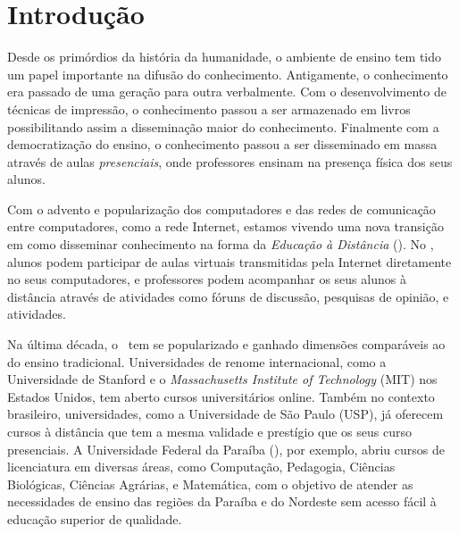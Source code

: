 \chapter{Introdução}


Desde os primórdios da história da humanidade, o ambiente de ensino tem tido um papel
importante na difusão do conhecimento. Antigamente, o conhecimento era passado de uma
geração para outra verbalmente. Com o desenvolvimento de técnicas de impressão, o conhecimento
passou a ser armazenado em livros possibilitando assim a disseminação maior do conhecimento. 
Finalmente com a democratização do ensino, o conhecimento passou a ser disseminado em massa 
através de aulas \emph{presenciais}, onde professores ensinam na presença física dos seus alunos. 

Com o advento e popularização dos computadores e das redes de comunicação entre computadores, como a rede Internet, 
estamos vivendo uma nova transição em como disseminar conhecimento na forma da \emph{Educação à Distância} (\ead). 
No \ead, alunos podem participar de aulas virtuais transmitidas pela Internet diretamente no seus computadores, 
e professores podem acompanhar os seus alunos à distância através de atividades como 
fóruns de discussão, pesquisas de opinião, e atividades.

Na última década, o \ead\ tem se popularizado e ganhado dimensões comparáveis ao do ensino  
tradicional. Universidades de renome internacional, como a Universidade de Stanford e o \emph{Massachusetts Institute of 
Technology} (MIT) nos Estados Unidos, tem aberto cursos universitários online. Também no contexto brasileiro, 
universidades, como a Universidade de São Paulo (USP), já oferecem cursos 
à distância que tem a mesma validade e prestígio que os seus curso presenciais. 
A Universidade Federal da Paraíba (\ufpb), por exemplo, abriu cursos de licenciatura em 
diversas áreas, como Computação, Pedagogia, Ciências Biológicas, Ciências Agrárias, e Matemática,
com o objetivo de atender as necessidades de ensino das regiões da Paraíba e do Nordeste sem acesso fácil
à educação superior de qualidade. 



